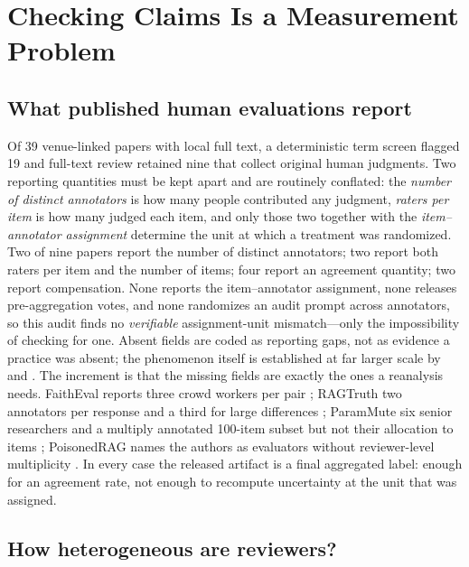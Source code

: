 \documentclass[11pt]{article}
\begin{document}
\section{Checking Claims Is a Measurement Problem}
\label{sec:simulation}
\label{sec:published-audit}

\subsection{What published human evaluations report}

Of 39 venue-linked papers with local full text, a deterministic term screen
flagged 19 and full-text review retained nine that collect original human
judgments. Two reporting quantities must be kept apart and are routinely
conflated: the \emph{number of distinct annotators} is how many people
contributed any judgment, \emph{raters per item} is how many judged each item,
and only those two together with the \emph{item--annotator assignment}
determine the unit at which a treatment was randomized. Two of nine papers
report the number of distinct annotators; two report both raters per item and
the number of items; four report an agreement quantity; two report
compensation. None reports the item--annotator assignment, none releases
pre-aggregation votes, and none randomizes an audit prompt across annotators,
so this audit finds no \emph{verifiable} assignment-unit mismatch---only the
impossibility of checking for one. Absent fields are coded as reporting gaps,
not as evidence a practice was absent; the phenomenon itself is established at
far larger scale by \citet{howcroft2020twenty} and \citet{vanderlee2021human}.
The increment is that the missing fields are exactly the ones a reanalysis
needs. FaithEval reports three crowd workers per pair \citep{faithEval2025}; RAGTruth
two annotators per response and a third for large differences
\citep{ragTruth2024}; ParamMute six senior researchers and a multiply annotated
100-item subset but not their allocation to items \citep{paramMute2025}; PoisonedRAG
names the authors as evaluators without reviewer-level multiplicity
\citep{poisonedRAG2024}. In every case the released artifact is a final
aggregated label: enough for an agreement rate, not enough to recompute
uncertainty at the unit that was assigned.

\subsection{How heterogeneous are reviewers?}
\label{sec:sigma}
\end{document}
